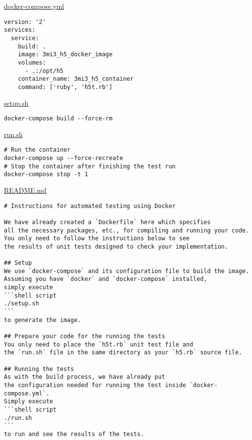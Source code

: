 \documentclass[11pt]{article}
\begin{document}
\href{./testing/h5/docker-compose.yml}{docker-compose.yml}
\begin{verbatim}
version: '2'
services:
  service:
    build: .
    image: 3mi3_h5_docker_image
    volumes:
      - .:/opt/h5
    container_name: 3mi3_h5_container
    command: ['ruby', 'h5t.rb']
\end{verbatim}

\href{./testing/h5/setup.sh}{setup.sh}
\begin{verbatim}
docker-compose build --force-rm
\end{verbatim}

\href{./testing/h5/run.sh}{run.sh}
\begin{verbatim}
# Run the container
docker-compose up --force-recreate
# Stop the container after finishing the test run
docker-compose stop -t 1
\end{verbatim}

\href{./testing/h5/README.md}{README.md}
\begin{verbatim}
# Instructions for automated testing using Docker

We have already created a `Dockerfile` here which specifies
all the necessary packages, etc., for compiling and running your code.
You only need to follow the instructions below to see 
the results of unit tests designed to check your implementation.

## Setup
We use `docker-compose` and its configuration file to build the image.
Assuming you have `docker` and `docker-compose` installed,
simply execute
```shell script
./setup.sh
```
to generate the image.

## Prepare your code for the running the tests
You only need to place the `h5t.rb` unit test file and
the `run.sh` file in the same directory as your `h5.rb` source file.

## Running the tests
As with the build process, we have already put
the configuration needed for running the test inside `docker-compose.yml`.
Simply execute
```shell script
./run.sh
```
to run and see the results of the tests.
\end{verbatim}
\end{document}
